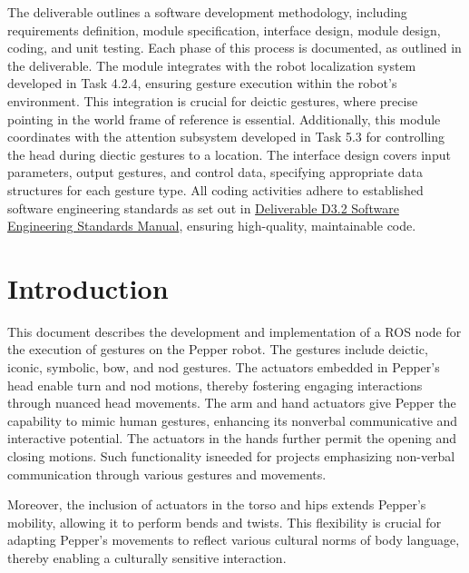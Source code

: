 \documentclass{CSSRforAfrica}
\begin{document}
The deliverable outlines a software development methodology, including requirements definition, module specification, interface design, module design, coding, and unit testing. Each phase of this process is documented, as outlined in the deliverable. The module integrates with the robot localization system developed in Task 4.2.4, ensuring gesture execution within the robot's environment. This integration is crucial for deictic gestures, where precise pointing in the world frame of reference is essential. Additionally, this module coordinates with the attention subsystem developed in Task 5.3 for controlling the head during diectic gestures to a location. The interface design covers input parameters, output gestures, and control data, specifying appropriate data structures for each gesture type. All coding activities adhere to established software engineering standards as set out in \href{https://cssr4africa.github.io/deliverables/CSSR4Africa_Deliverable_D3.2.pdf} {Deliverable D3.2 Software Engineering Standards Manual}, ensuring high-quality, maintainable code. 

\newpage
 
 
\pagebreak
\tableofcontents
\newpage


\section{Introduction}
This document describes the development and implementation of a ROS node for the execution of gestures on the Pepper robot. The gestures include deictic, iconic, symbolic, bow, and nod gestures.
The actuators embedded in Pepper's head enable turn and nod motions, thereby fostering engaging interactions 
through nuanced head movements. The arm and hand actuators give Pepper the capability to mimic human gestures, enhancing its nonverbal communicative and interactive potential. The actuators in the hands further 
permit the opening and closing motions. Such functionality isneeded for projects emphasizing non-verbal communication 
through various gestures and movements.

Moreover, the inclusion of actuators in the torso and hips extends Pepper's mobility, allowing it to perform bends and twists. 
This flexibility is crucial for adapting Pepper's movements to reflect various cultural norms of body language, thereby 
enabling a culturally sensitive interaction. 
\end{document}
